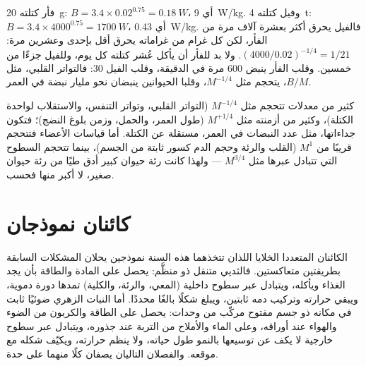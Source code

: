 \begin{example}\label{ex:b1:organism-environment:mouseelephant}
فأر كتلته \qty{20}{g}: $B = 3.4\times 0.02^{0.75} = \qty{0.18}{W}$،
أي \qty{9}{W/kg}. وفيل كتلته \qty{4}{t}: $B = 3.4\times 4000^{0.75} =
\qty{1700}{W}$، أي \qty{0.43}{W/kg}.
فالفيل يحرق أكثر بعشرة آلاف مرة من الفأر، لكن كل غرام من غراماته
يحرق أقل بإحدى وعشرين مرة: $(4000/0.02)^{-1/4} = 1/21$. ولا بد
للفأر أن يأكل عُشر كتلته كل يوم، وللفيل جزءًا من خمسين. وقلب الفأر
ينبض \qty{600}{} مرة في الدقيقة، وقلب الفيل \qty{30}{}: فالتواتر
القلبي، مثل $B/M$، يتحجم مثل $M^{-1/4}$، وقلبا الحيوانين ينبضان نحو
مليار نبضة في العمر.
\end{example}

\begin{remark}\label{rem:b1:organism-environment:consequences}
كثير من معدلات  تتحجم مثل $M^{-1/4}$ (التواتر القلبي،
وتواتر التنفس، والاستقلاب لواحدة الكتلة)، وكثير من أزمنته مثل
$M^{+1/4}$ (طول العمر، والحمل، وزمن بلوغ النضج)؛ فتكون جداءاتها،
مثل عدد النبضات في العمر، مستقلة عن الكتلة. أما قياسات الأعضاء
فتتحجم قريبًا من $M^{1}$ (القلب والرئة وحجم الدم كسور ثابتة من
الجسم)، بينما تتحجم السطوح التي تتبادل عبرها مثل $M^{3/4}$ --- ولهذا
كانت رئة حيوان كبير أدق طيًا من رئة حيوان صغير، لا أكبر منها فحسب.
\end{remark}

\section{كائنان نموذجان}

\begin{proposition}\label{prop:b1:organism-environment:models}
الكائنان المتعددا الخلايا اللذان تتخذهما هذه السنة نموذجين يحلان
المشكلات السابقة بطريقتين متعاكستين. فالثديي  متنقل
ذو  منظَّم: يحصل على المادة والطاقة بأن يجد الغذاء
ويأكله، ويتبادل عبر سطوح داخلية (المعي، والرئة، والكلية) تمدها
دورة دموية، ويبقي حرارته وتركيب دمه ثابتين، ويبلغ شكلًا بالغًا
محددًا. أما النبات الزهري  ضوئيًا ثابت في مكانه ذو جسم
مفتوح مركّب من وحدات: يحصل على الطاقة والكربون من الضوء والهواء عند
أوراقه، وعلى الماء والأملاح من التربة عند جذوره، ويتبادل عبر سطوح
خارجية لا يكف عن توسيعها بالنمو طول حياته، ولا ينظم حرارته، ويكيّف
شكله مع موقعه. والفصلان التاليان يصفان كلًا منهما على حدة.
\end{proposition}

